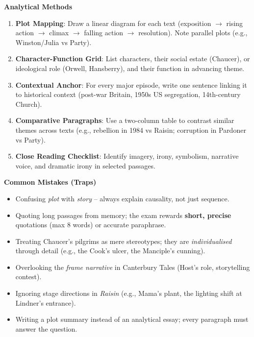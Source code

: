 \documentclass[11pt]{article}
\newcommand{\cle}[1]{{\popxbold\color{popdark}#1}}
\begin{document}
\begin{bilan}
\textbf{Analytical Methods}
\begin{enumerate}
  \item \textbf{Plot Mapping}: Draw a linear diagram for each text (exposition $\rightarrow$ rising action $\rightarrow$ climax $\rightarrow$ falling action $\rightarrow$ resolution). Note parallel plots (e.g., Winston/Julia vs Party).
  \item \textbf{Character-Function Grid}: List characters, their social estate (Chaucer), or ideological role (Orwell, Hansberry), and their function in advancing theme.
  \item \textbf{Contextual Anchor}: For every major episode, write one sentence linking it to historical context (post-war Britain, 1950s US segregation, 14th-century Church).
  \item \textbf{Comparative Paragraphs}: Use a two-column table to contrast similar themes across texts (e.g., rebellion in 1984 vs Raisin; corruption in Pardoner vs Party).
  \item \textbf{Close Reading Checklist}: Identify \cle{imagery}, \cle{irony}, \cle{symbolism}, \cle{narrative voice}, and \cle{dramatic irony} in selected passages.
\end{enumerate}

\textbf{Common Mistakes (Traps)}
\begin{itemize}
  \item Confusing \emph{plot} with \emph{story} -- always explain causality, not just sequence.
  \item Quoting long passages from memory; the exam rewards \textbf{short, precise} quotations (max 8 words) or accurate paraphrase.
  \item Treating Chaucer's pilgrims as mere stereotypes; they are \emph{individualised} through detail (e.g., the Cook's ulcer, the Manciple's cunning).
  \item Overlooking the \emph{frame narrative} in Canterbury Tales (Host's role, storytelling contest).
  \item Ignoring stage directions in \emph{Raisin} (e.g., Mama's plant, the lighting shift at Lindner's entrance).
  \item Writing a plot summary instead of an analytical essay; every paragraph must answer the question.
\end{itemize}


\end{bilan}
\end{document}
